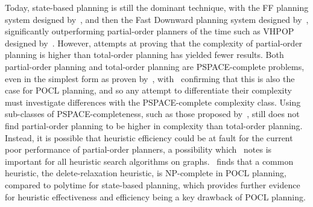 Today, state-based planning is still the dominant technique, with the FF planning system designed by~\cite{Hoffmann2001FFPlanning}, and then the Fast Downward planning system designed by~\cite{Helmert2006FastDownward}, significantly outperforming partial-order planners of the time such as VHPOP designed by~\cite{Younes2003VHPOPAndAdditiveHeuristic}. However, attempts at proving that the complexity of partial-order planning is higher than total-order planning has yielded fewer results. Both partial-order planning and total-order planning are PSPACE-complete problems, even in the simplest form as proven by~\cite{Bylander1994ComplexityOfSTRIPS}, with~\cite{Bercher2021POCLComplexities} confirming that this is also the case for POCL planning, and so any attempt to differentiate their complexity must investigate differences with the PSPACE-complete complexity class. Using sub-classes of PSPACE-completeness, such as those proposed by~\cite{Backstrom2011PSPACECompletePlanning}, still does not find partial-order planning to be higher in complexity than total-order planning. Instead, it is possible that heuristic efficiency could be at fault for the current poor performance of partial-order planners, a possibility which~\cite{Balcazar1996ImplicitGraphs} notes is important for all heuristic search algorithms on graphs.~\cite{Bercher2021POCLComplexities} finds that a common heuristic, the delete-relaxation heuristic, is NP-complete in POCL planning, compared to polytime for state-based planning, which provides further evidence for heuristic effectiveness and efficiency being a key drawback of POCL planning.\\


